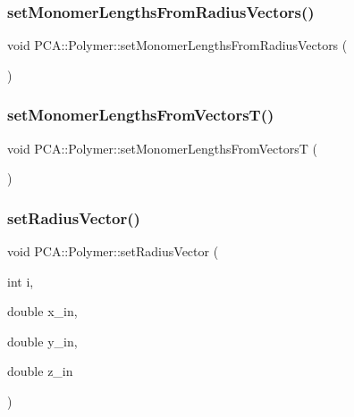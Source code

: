 \subsubsection{\texorpdfstring{set\+Monomer\+Lengths\+From\+Radius\+Vectors()}{setMonomerLengthsFromRadiusVectors()}}
{\footnotesize\ttfamily void P\+C\+A\+::\+Polymer\+::set\+Monomer\+Lengths\+From\+Radius\+Vectors (\begin{DoxyParamCaption}{ }\end{DoxyParamCaption})}

\hypertarget{class_p_c_a_1_1_polymer_a217cddfa5b9e5bfe68f8e5d0802e2f31}{}\label{class_p_c_a_1_1_polymer_a217cddfa5b9e5bfe68f8e5d0802e2f31} 
\subsubsection{\texorpdfstring{set\+Monomer\+Lengths\+From\+Vectors\+T()}{setMonomerLengthsFromVectorsT()}}
{\footnotesize\ttfamily void P\+C\+A\+::\+Polymer\+::set\+Monomer\+Lengths\+From\+VectorsT (\begin{DoxyParamCaption}{ }\end{DoxyParamCaption})}

\hypertarget{class_p_c_a_1_1_polymer_a0c6e93aa35271b98d92a38afd2b0913d}{}\label{class_p_c_a_1_1_polymer_a0c6e93aa35271b98d92a38afd2b0913d} 
\subsubsection{\texorpdfstring{set\+Radius\+Vector()}{setRadiusVector()}}
{\footnotesize\ttfamily void P\+C\+A\+::\+Polymer\+::set\+Radius\+Vector (\begin{DoxyParamCaption}\item[{int}]{i,  }\item[{double}]{x\+\_\+in,  }\item[{double}]{y\+\_\+in,  }\item[{double}]{z\+\_\+in }\end{DoxyParamCaption})\hspace{0.3cm}{\ttfamily [inline]}}



